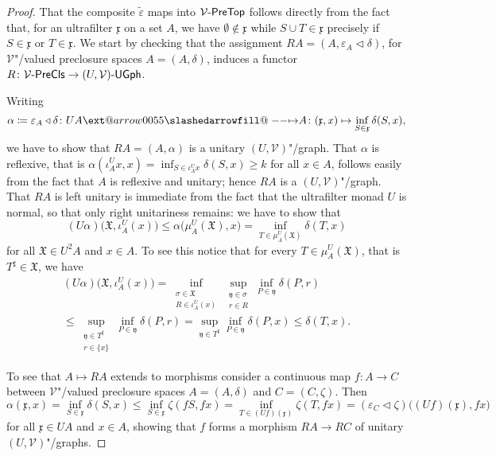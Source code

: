 \documentclass[preprint, a4paper]{elsarticle}
\makeatletter
\def\slashedarrowfill@#1#2#3#4#5{%
  $\m@th\thickmuskip0mu\medmuskip\thickmuskip\thinmuskip\thickmuskip
   \relax#5#1\mkern-7mu%
   \cleaders\hbox{$#5\mkern-2mu#2\mkern-2mu$}\hfill
   \mathclap{#3}\mathclap{#2}%
   \cleaders\hbox{$#5\mkern-2mu#2\mkern-2mu$}\hfill
   \mkern-7mu#4$%
}
\def\rightslashedarrowfill@{%
  \slashedarrowfill@\relbar\relbar\mapstochar\rightarrow}
\newcommand\xslashedrightarrow[2][]{%
  \ext@arrow 0055{\rightslashedarrowfill@}{#1}{#2}}
\def\slashedrightarrow{\xslashedrightarrow{}}
\theoremstyle{definition}
\theoremstyle{remark}
\providecommand{\dfn}{\coloneqq}
\providecommand{\eps}{\varepsilon}
\providecommand{\mf}[1]{\mathfrak{#1}}
\providecommand{\brcs}[1]{\lbrace #1 \rbrace}
\providecommand{\bigpars}[1]{\bigl(#1\bigr)}
\providecommand{\set}[1]{\brcs{#1}}
\providecommand{\union}{\cup}
\providecommand{\map}[3]{#1\colon#2\to#3}
\providecommand{\hmap}[3]{#1\colon#2\slashedrightarrow#3}
\providecommand{\catvar}[1]{\mathcal{#1}}
\providecommand{\2}{\mathsf 2}
\providecommand{\V}{\catvar V}
\providecommand{\PreTop}[1]{#1\text-\mathsf{PreTop}}
\providecommand{\PreCls}[1]{#1\text-\mathsf{PreCls}}
\providecommand{\UGph}[1]{#1\text-\mathsf{UGph}}
\providecommand{\lhom}{\triangleleft}
\makeatother
\begin{document}
	\begin{proof}
		That the composite $\tilde \eps$ maps into $\PreTop\V$ follows directly from the fact that, for an ultrafilter $\mf x$ on a set $A$, we have $\emptyset \notin \mf x$ while $S \union T \in \mf x$ precisely if $S \in \mf x$ or $T \in \mf x$. We start by checking that the assignment $RA = (A, \eps_A \lhom \delta)$, for $\V$"/valued preclosure spaces $A = (A, \delta)$, induces a functor $\map R{\PreCls\V}{\UGph{(U, \V)}}$.
		
		Writing
		\begin{displaymath}
			\hmap{\alpha \dfn \eps_A \lhom \delta}{UA}A\colon (\mf x, x) \mapsto \inf_{S \in \mf x}\delta(S, x),
		\end{displaymath}
		we have to show that $RA = (A, \alpha)$ is a unitary $(U, \V)$"/graph. That $\alpha$ is reflexive, that is $\alpha(\iota^U_A x, x) = \inf_{S \in \iota^U_A x} \delta(S, x) \geq k$ for all $x \in A$, follows easily from the fact that $A$ is reflexive and unitary; hence $RA$ is a $(U, \V)$"/graph. That $RA$ is left unitary is immediate from the fact that the ultrafilter monad $U$ is normal, so that only right unitariness remains: we have to show that
		\begin{displaymath}
			(U\alpha)\bigpars{\mf X, \iota_A^U(x)} \leq \alpha\bigpars{\mu_A^U(\mf X), x} = \inf_{T \in \mu_A^U(\mf X)} \delta(T, x)
		\end{displaymath}
		for all $\mf X \in U^2A$ and $x \in A$. To see this notice that for every $T \in \mu_A^U(\mf X)$, that is $T^\sharp \in \mf X$, we have
		\begin{multline*}
			(U\alpha)\bigpars{\mf X, \iota_A^U(x)} = \inf_{\substack{\sigma \in \mf X \\ R \in \iota_A^U(x)}} \sup_{\substack{\mf y \in \sigma \\ r \in R}}\inf_{P \in \mf y} \delta(P, r) \\
			\leq \sup_{\substack{\mf y \in T^\sharp \\ r \in \set x}} \inf_{P \in \mf y} \delta(P, r) = \sup_{\mf y \in T^\sharp} \inf_{P \in \mf y} \delta(P, x) \leq \delta(T, x).
		\end{multline*}
		
		To see that $A \mapsto RA$ extends to morphisms consider a continuous map $\map fAC$ between $\V$"/valued preclosure spaces $A = (A, \delta)$ and $C = (C, \zeta)$. Then
		\begin{displaymath}
			\alpha(\mf x, x) = \inf_{S \in \mf x} \delta(S, x) \leq \inf_{S \in \mf x} \zeta(fS, fx) = \inf_{T \in (Uf)(\mf x)} \zeta(T, fx) = (\eps_C \lhom \zeta)\bigpars{(Uf)(\mf x), fx}
		\end{displaymath}
		for all $\mf x \in UA$ and $x \in A$, showing that $f$ forms a morphism $RA \to RC$ of unitary $(U, \V)$"/graphs.
		

\end{proof}
\end{document}
